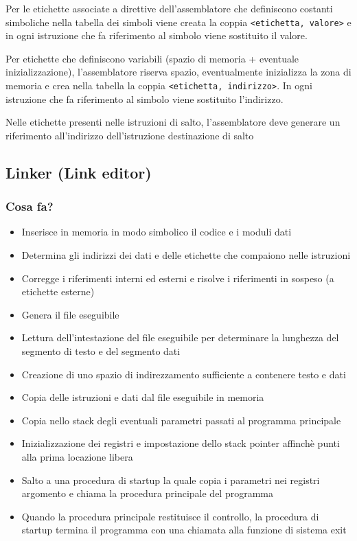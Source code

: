 Per le etichette associate a direttive dell'assemblatore che definiscono costanti simboliche nella tabella dei simboli viene creata la coppia \texttt{<etichetta, valore>} e in ogni istruzione che fa riferimento al simbolo viene sostituito il valore.

Per etichette  che definiscono variabili (spazio di memoria + eventuale inizializzazione), l'assemblatore riserva spazio, eventualmente inizializza la zona di memoria e crea nella tabella la coppia \texttt{<etichetta, indirizzo>}. In ogni istruzione che fa riferimento al simbolo viene sostituito l'indirizzo.

Nelle etichette presenti nelle istruzioni di salto, l'assemblatore deve generare un riferimento all'indirizzo dell'istruzione destinazione di salto

\newpage
\subsection{Linker (Link editor)}
\subsubsection{Cosa fa?}
\begin{itemize}
    \item Inserisce in memoria in modo simbolico il codice e i moduli dati
    \item Determina gli indirizzi dei dati e delle etichette che compaiono nelle istruzioni
    \item Corregge i riferimenti interni ed esterni e risolve i riferimenti in sospeso (a etichette esterne)
    \item Genera il file eseguibile
    \item Lettura dell'intestazione del file eseguibile per determinare la lunghezza del segmento di testo e del segmento dati
    \item Creazione di uno spazio di indirezzamento sufficiente a contenere testo e dati
    \item Copia delle istruzioni e dati dal file eseguibile in memoria
    \item Copia nello stack degli eventuali parametri passati al programma principale
    \item Inizializzazione dei registri e impostazione dello stack pointer affinchè punti alla prima locazione libera
    \item Salto a una procedura di startup la quale copia i parametri nei registri argomento e chiama la procedura principale del programma
    \item Quando la procedura principale restituisce il controllo, la procedura di startup termina il programma con una chiamata alla funzione di sistema exit
\end{itemize}
